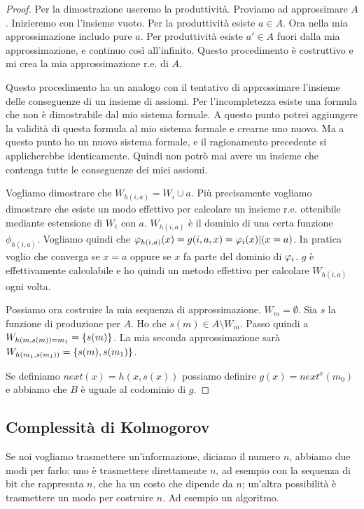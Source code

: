 \begin{proof}
    Per la dimostrazione useremo la produttività. Proviamo ad approssimare $A$. Inizieremo con l'insieme
    vuoto. Per la produttività esiste $a \in A$. Ora nella mia approssimazione includo pure $a$. Per
    produttività esiste $a' \in A$ fuori dalla mia approssimazione, e continuo così all'infinito. Questo
    procedimento è costruttivo e mi crea la mia approssimazione r.e. di $A$.

    Questo procedimento ha un analogo con il tentativo di approssimare l'insieme delle conseguenze
    di un insieme di assiomi. Per l'incompletezza esiste una formula che non è dimostrabile dal mio
    sistema formale. A questo punto potrei aggiungere la validità di questa formula al mio sistema
    formale e crearne uno nuovo. Ma a questo punto ho un nuovo sistema formale, e il ragionamento
    precedente si applicherebbe identicamente. Quindi non potrò mai avere un insieme che contenga
    tutte le conseguenze dei miei assiomi.

    Vogliamo dimostrare che $W_{h(i,a)} = W_{i} \cup {a}$. Più precisamente vogliamo dimostrare che
    esiste un modo effettivo per calcolare un insieme r.e. ottenibile mediante estensione di $W_{i}$
    con $a$. $W_{h(i,a)}$ è il dominio di una certa funzione $\phi_{h(i,a)}$. Vogliamo quindi che
    $\varphi_{h(i,a)}(x) = g(i,a,x) = \varphi_{i}(x)|(x = a)$. In pratica voglio che converga se $x = a$ oppure se
    $x$ fa parte del dominio di $\varphi_{i}$. $g$ è effettivamente calcolabile e ho quindi un metodo effettivo
    per calcolare $W_{h(i,a)}$ ogni volta.

    Possiamo ora costruire la mia sequenza di approssimazione. $W_{m} = \emptyset$. Sia $s$ la
    funzione di produzione per $A$. Ho che $s(m) \in A \setminus W_{m}$. Passo quindi a
    $W_{h(m,s(m))=m_{1}} = \{s(m)\}$. La mia seconda approssimazione sarà $W_{h(m_{1},s(m_{1}))} =
    \{s(m),s(m_{1})\}$.

    Se definiamo $\textit{next}(x) = h(x,s(x))$ possiamo definire $g(x) = next^{x}(m_{0})$ e abbiamo
    che $B$ è uguale al codominio di $g$.
\end{proof}

\subsection{Complessità di Kolmogorov}

Se noi vogliamo trasmettere un'informazione, diciamo il numero $n$, abbiamo due modi per farlo: uno
è trasmettere direttamente $n$, ad esempio con la sequenza di bit che rappresnta $n$, che ha un
costo che dipende da $n$; un'altra possibilità è trasmettere un modo per costruire $n$. Ad esempio un
algoritmo.


